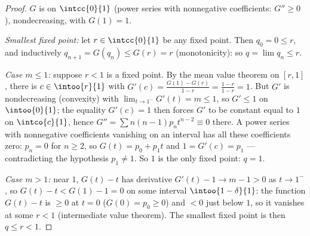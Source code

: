 \begin{proof}
$G$ is  on $\intcc{0}{1}$ (power series with nonnegative
coefficients: $G'' \geq 0$), nondecreasing, with $G(1) = 1$.

\emph{Smallest fixed point:} let $r \in \intcc{0}{1}$ be any fixed
point. Then $q_0 = 0 \leq r$, and inductively $q_{n+1} = G(q_n)
\leq G(r) = r$ (monotonicity): so $q = \lim q_n \leq r$.

\emph{Case $m \leq 1$:} suppose $r < 1$ is a fixed point. By the
mean value theorem on $[r, 1]$, there is $c \in \intoo{r}{1}$ with
$G'(c) = \frac{G(1) - G(r)}{1 - r} = \frac{1 - r}{1 - r} = 1$. But
$G'$ is nondecreasing (convexity) with $\lim_{t\to1^-}G'(t) = m
\leq 1$, so $G' \leq 1$ on $\intoo{0}{1}$; the equality $G'(c) =
1$ then forces $G'$ to be constant equal to $1$ on $\intco{c}{1}$,
hence $G'' = \sum n(n-1)p_nt^{n-2} \equiv 0$ there. A power series
with nonnegative coefficients vanishing on an interval has all
these coefficients zero: $p_n = 0$ for $n \geq 2$, so $G(t) = p_0
+ p_1t$ and $1 = G'(c) = p_1$ --- contradicting the hypothesis
$p_1 \neq 1$. So $1$ is the only fixed point: $q = 1$.

\emph{Case $m > 1$:} near $1$, $G(t) - t$ has derivative $G'(t) -
1 \to m - 1 > 0$ as $t \to 1^-$, so $G(t) - t < G(1) - 1 = 0$ on
some interval $\intoo{1 - \delta}{1}$: the  function
$G(t) - t$ is $\geq 0$ at $t = 0$ ($G(0) = p_0 \geq 0$) and $< 0$
just below $1$, so it vanishes at some $r < 1$ (intermediate value
theorem). The smallest fixed point is then $q \leq r < 1$.
\end{proof}

